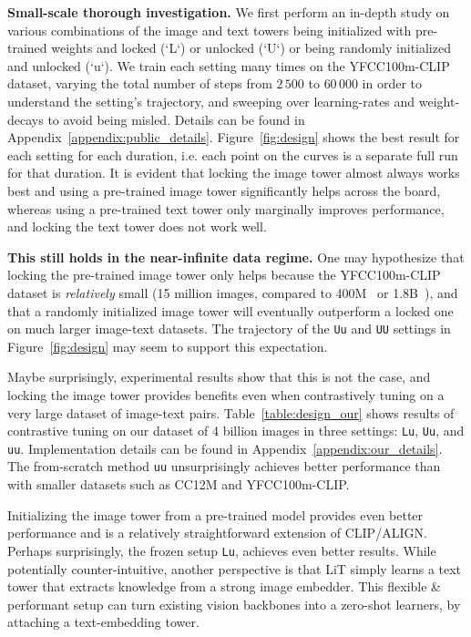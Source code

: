 \documentclass[10pt,twocolumn,letterpaper]{article}
\makeatletter
\def \lit {LiT\xspace}
\def \Lu {{\tt Lu}\xspace}
\def \Uu {{\tt Uu}\xspace}
\def \UU {{\tt UU}\xspace}
\def \uu {{\tt uu}\xspace}
\renewcommand*{\ie}{i.e.\@\xspace}
\makeatother
\begin{document}
\textbf{Small-scale thorough investigation.} We first perform an in-depth study on various combinations of the image and text towers being initialized with pre-trained weights and locked (`L`) or unlocked (`U`) or being randomly initialized and unlocked (`u`).
We train each setting many times on the YFCC100m-CLIP dataset, varying the total number of steps from $2\,500$ to $60\,000$ in order to understand the setting's trajectory, and sweeping over learning-rates and weight-decays to avoid being misled.
Details can be found in Appendix~\ref{appendix:public_details}.
Figure~\ref{fig:design} shows the best result for each setting for each duration, \ie each point on the curves is a separate full run for that duration.
It is evident that locking the image tower almost always works best and using a pre-trained image tower significantly helps across the board, whereas using a pre-trained text tower only marginally improves performance, and locking the text tower does not work well.

\textbf{This still holds in the near-infinite data regime.} One may hypothesize that locking the pre-trained image tower only helps because the YFCC100m-CLIP dataset is \emph{relatively} small (15 million images, compared to 400M~\cite{clip} or 1.8B~\cite{align}), and that a randomly initialized image tower will eventually outperform a locked one on much larger image-text datasets.
The trajectory of the \Uu and \UU settings in Figure~\ref{fig:design} may seem to support this expectation.

Maybe surprisingly, 
experimental results
show that this is not the case, and locking the image tower provides benefits even when contrastively tuning on a very large dataset of image-text pairs.
Table~\ref{table:design_our} shows results of contrastive tuning on our dataset of 4 billion images in three settings: \Lu, \Uu, and \uu.
Implementation details can be found in Appendix~\ref{appendix:our_details}.
The from-scratch method \uu unsurprisingly achieves better performance than with smaller datasets such as CC12M and YFCC100m-CLIP. 

Initializing the image tower from a pre-trained model provides even better performance and is a relatively straightforward extension of CLIP/ALIGN.
Perhaps surprisingly, the frozen setup \Lu, achieves even better results. 
While potentially counter-intuitive, another perspective is that \lit simply learns a text tower that extracts knowledge from a strong image embedder. 
This flexible \& performant setup can turn existing vision backbones into a zero-shot learners, by attaching a text-embedding tower.
\end{document}
